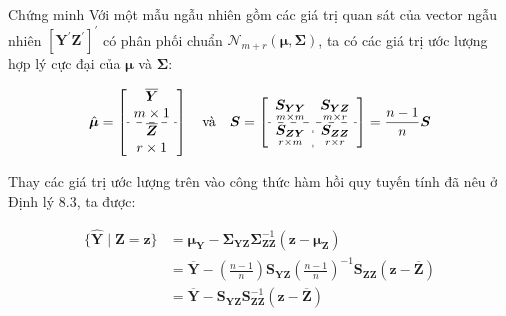 
\begin{frame}
    \begin{block}{Chứng minh}
        Với một mẫu ngẫu nhiên gồm các giá trị quan 
sát của vector ngẫu nhiên 
        \(\left[\boldsymbol{Y}^\prime \boldsymbol{Z}^\prime\right]^\prime\) có phân phối chuẩn \(\mathcal{N}_{m+r}(\boldsymbol{\mu}, \boldsymbol{\Sigma})\), ta có các giá trị ước lượng hợp lý cực đại của \(\boldsymbol{\mu}\) và \(\boldsymbol{\Sigma}\):

        \[
        \hat{\boldsymbol{\mu}} = \left[\begin{array}{c}
\overline{\boldsymbol{Y}} \\
m \times 1 \\
\hdashline \overline{\boldsymbol{Z}} \\
r \times 1
\end{array}\right]
        \quad \text{và} \quad
        \boldsymbol{S}=\left[\begin{array}{c:c}
\underset{m \times m}{\boldsymbol{S}_{\boldsymbol{Y} \boldsymbol{Y}}} & \underset{m \times r}{\boldsymbol{S}_{\boldsymbol{Y Z}}} \\
\hdashline \underset{r \times m}{\boldsymbol{S}_{\boldsymbol{Z} \boldsymbol{Y}}} & \underset{r \times r}{\boldsymbol{S}_{\boldsymbol{Z Z}}}
\end{array}\right] = \frac{n-1}{n}\boldsymbol{S}
        \]

        Thay các giá trị ước lượng trên vào công thức hàm hồi quy tuyến tính đã nêu ở Định lý 8.3, ta được:

        \begin{align*}
            \{\hat{\boldsymbol{Y}} \mid \boldsymbol{Z} = \boldsymbol{z}\} &= \boldsymbol{\mu}_{\boldsymbol{Y}} - \boldsymbol{\Sigma}_{\boldsymbol{Y} \boldsymbol{Z}} \boldsymbol{\Sigma}_{\boldsymbol{Z} \boldsymbol{Z}}^{-1} (\boldsymbol{z} - \boldsymbol{\mu}_{\boldsymbol{Z}}) \\
            &= \overline{\boldsymbol{Y}} - \left(\frac{n-1}{n}\right) \boldsymbol{S}_{\boldsymbol{Y} \boldsymbol{Z}} \left(\frac{n-1}{n}\right)^{-1} \boldsymbol{S}_{\boldsymbol{Z} \boldsymbol{Z}} (\boldsymbol{z} - \overline{\boldsymbol{Z}}) \\
            &= \overline{\boldsymbol{Y}} - \boldsymbol{S}_{\boldsymbol{Y} \boldsymbol{Z}} \boldsymbol{S}_{\boldsymbol{Z} \boldsymbol{Z}}^{-1} (\boldsymbol{z} - \overline{\boldsymbol{Z}})
        \end{align*}
    \end{block}
\end{frame}


